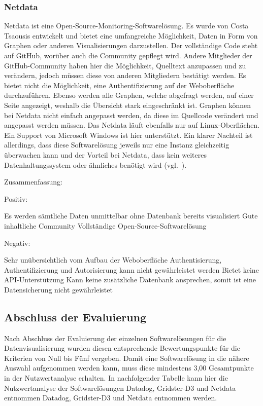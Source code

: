 {\subsubsection{Netdata}
\label{subsubsec:netdata}
Netdata ist eine Open\hyp{}Source\hyp{}Monitoring\hyp{}Softwarelösung. Es wurde
von Costa Tsaousis entwickelt und bietet eine umfangreiche Möglichkeit, Daten
in Form von Graphen oder anderen Visualisierungen darzustellen. Der
vollständige Code steht auf GitHub, worüber auch die Community gepflegt wird.
Andere Mitglieder der GitHub\hyp{}Community haben hier die Möglichkeit,
Quelltext anzupassen und zu verändern, jedoch müssen diese von anderen
Mitgliedern bestätigt werden. Es bietet nicht die Möglichkeit, eine
Authentifizierung auf der Weboberfläche durchzuführen. Ebenso werden alle
Graphen, welche abgefragt werden, auf einer Seite angezeigt, weshalb die
Übersicht stark eingeschränkt ist. Graphen können bei Netdata nicht einfach
angepasst werden, da diese im Quellcode verändert und angepasst werden müssen.
Das Netdata läuft ebenfalls nur auf Linux\hyp{}Oberflächen.  Ein Support von
Microsoft Windows ist hier unterstützt. Ein klarer Nachteil ist allerdings,
dass diese Softwarelösung jeweils nur eine Instanz gleichzeitig überwachen kann
und der Vorteil bei Netdata, dass kein weiteres Datenhaltungssystem oder
ähnliches benötigt wird (vgl.~\cite{netdata}).

Zusammenfassung:

Positiv:

\begin{outline}
  \1 Es werden sämtliche Daten unmittelbar ohne Datenbank bereits visualisiert
  \1 Gute inhaltliche Community
  \1 Vollständige Open\hyp{}Source\hyp{}Softwarelösung
\end{outline}

Negativ:

\begin{outline}
  \1 Sehr unübersichtlich vom Aufbau der Weboberfläche
  \1 Authentisierung, Authentifizierung und Autorisierung kann nicht
  gewährleistet werden
  \1 Bietet keine API\hyp{}Unterstützung
  \1 Kann keine zusätzliche Datenbank ansprechen, somit ist eine Datensicherung
  nicht gewährleistet
\end{outline}
\mr%

\subsection{Abschluss der Evaluierung}
\label{subsec:abschluss_evaluierung}
Nach Abschluss der Evaluierung der einzelnen Softwarelösungen für die
Datenvisualisierung wurden diesen entsprechende Bewertungspunkte für die
Kriterien von Null bis Fünf vergeben. Damit eine Softwarelösung in die nähere
Auswahl aufgenommen werden kann, muss diese mindestens 3,00 Gesamtpunkte in der
Nutzwertanalyse erhalten. In nachfolgender Tabelle kann hier die
Nutzwertanalyse der Softwarelösungen Datadog, Gridster-D3 und Netdata entnommen
Datadog, Gridster\hyp{}D3 und Netdata entnommen werden.

}
